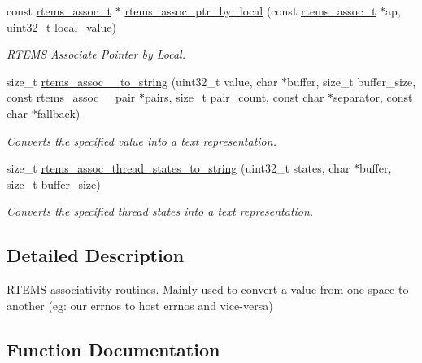 \begin{DoxyCompactItemize}
const \mbox{\hyperlink{structrtems__assoc__t}{rtems\+\_\+assoc\+\_\+t}} $\ast$ \mbox{\hyperlink{group__RTEMSAPIAssociativity_gae6d128f254090af571dd199a34799b7d}{rtems\+\_\+assoc\+\_\+ptr\+\_\+by\+\_\+local}} (const \mbox{\hyperlink{structrtems__assoc__t}{rtems\+\_\+assoc\+\_\+t}} $\ast$ap, uint32\+\_\+t local\+\_\+value)
\begin{DoxyCompactList}\small\item\em R\+T\+E\+MS Associate Pointer by Local. \end{DoxyCompactList}\item 
size\+\_\+t \mbox{\hyperlink{group__RTEMSAPIAssociativity_gaa149e62d967846d99365dbd65e510567}{rtems\+\_\+assoc\+\_\+\_\+to\+\_\+string}} (uint32\+\_\+t value, char $\ast$buffer, size\+\_\+t buffer\+\_\+size, const \mbox{\hyperlink{structrtems__assoc__32__pair}{rtems\+\_\+assoc\+\_\+\_\+pair}} $\ast$pairs, size\+\_\+t pair\+\_\+count, const char $\ast$separator, const char $\ast$fallback)
\begin{DoxyCompactList}\small\item\em Converts the specified value into a text representation. \end{DoxyCompactList}\item 
size\+\_\+t \mbox{\hyperlink{group__RTEMSAPIAssociativity_ga51b19a7a78172cafd6cf65c2c52ecd48}{rtems\+\_\+assoc\+\_\+thread\+\_\+states\+\_\+to\+\_\+string}} (uint32\+\_\+t states, char $\ast$buffer, size\+\_\+t buffer\+\_\+size)
\begin{DoxyCompactList}\small\item\em Converts the specified thread states into a text representation. \end{DoxyCompactList}\end{DoxyCompactItemize}


\subsection{Detailed Description}
R\+T\+E\+MS associativity routines. Mainly used to convert a value from one space to another (eg\+: our errno\textquotesingle{}s to host errno\textquotesingle{}s and vice-\/versa) 

\subsection{Function Documentation}
\mbox{\label{group__RTEMSAPIAssociativity_gaa149e62d967846d99365dbd65e510567}} 
